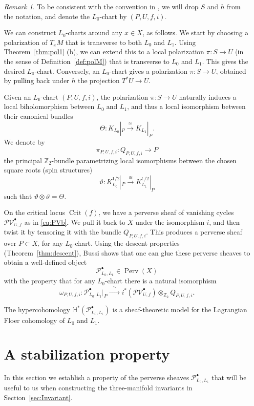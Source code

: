 \documentclass [11pt]{amsart}
\theoremstyle{remark}
\newtheorem {remark}[theorem]{Remark}
\def\zz {{\mathbb{Z}}}
\def\Z {\zz}
\def\HH{\mathbb{H}}
\def\Perv {\operatorname{Perv}}
\def\Pb {\mathcal{P}^\bullet}
\def\PVb {\mathcal{PV}^\bullet}
\def\Crit{\operatorname{Crit}}
\begin{document}
\begin{remark}
To be consistent with the convention in \cite[Section 2]{Bussi}, we will drop $S$ and $h$ from the notation, and denote the $L_0$-chart by $(P, U, f, i)$.
\end{remark}

We can construct $L_0$-charts around any $x \in X$, as follows. We start by choosing a polarization of $T_xM$ that is transverse to both $L_0$ and $L_1$. Using Theorem~\ref{thm:pol1} (b), we can extend this to a local polarization $\pi: S \to U$ (in the sense of Definition~\ref{def:polM}) that is transverse to $L_0$ and $L_1$. This gives the desired $L_0$-chart. Conversely, an $L_0$-chart gives a polarization $\pi: S \to U$, obtained by pulling back under $h$ the projection $T^*U \to U$.

Given an $L_0$-chart $(P, U, f, i)$, the polarization $\pi: S \to U$ naturally induces a local biholomorphism between $L_0$ and $L_1$, and thus a local isomorphism between their canonical bundles
$$ \Theta: K_{L_0}|_P \xrightarrow{\cong} K_{L_1}|_P.$$
We denote by 
$$ \pi_{P, U, f, i} : Q_{P, U, f, i} \to P$$
the principal $\Z_2$-bundle parametrizing local isomorphisms between the chosen square roots (spin structures)
$$ \vartheta: K^{1/2}_{L_0}|_P \xrightarrow{\cong} K^{1/2}_{L_1}|_P$$
such that $\vartheta \otimes \vartheta = \Theta.$

On the critical locus $\Crit(f)$, we have a perverse sheaf of vanishing cycles $\PVb_{U,f}$ as in \eqref{eq:PVb}. We pull it back to $X$ under the isomorphism $i$, and then twist it by tensoring it with the bundle $Q_{P, U, f, i}$. This produces a perverse sheaf over $P \subset X$, for any $L_0$-chart. Using the descent properties (Theorem~\ref{thm:descent}), Bussi shows that one can glue these perverse sheaves to obtain a well-defined object 
$$\Pb_{L_0, L_1} \in \Perv(X)$$
with the property that for any $L_0$-chart there is a natural isomorphism
\begin{equation}
\label{eq:omegaL0}
 \omega_{P,U,f, i}: \Pb_{L_0, L_1}|_P \xrightarrow{\phantom{b}\cong \phantom{b}}  i^*(\PVb_{U,f}) \otimes_{\Z_2} Q_{P, U, f, i}.
 \end{equation}

The hypercohomology $\HH^*(\Pb_{L_0, L_1})$ is a sheaf-theoretic model for the Lagrangian Floer cohomology of $L_0$ and $L_1$. 

\section{A stabilization property}
\label{sec:prop}
In this section we establish a property of the perverse sheaves $\Pb_{L_0, L_1}$ that will be useful to us when constructing the three-manifold invariants in Section~\ref{sec:Invariant}.
\end{document}
